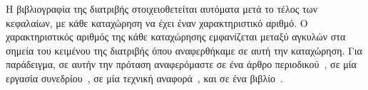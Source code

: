 Η βιβλιογραφία της διατριβής στοιχειοθετείται αυτόματα μετά το τέλος των κεφαλαίων, με κάθε καταχώρηση να έχει έναν χαρακτηριστικό αριθμό.
Ο χαρακτηριστικός αριθμός της κάθε καταχώρησης εμφανίζεται μεταξύ αγκυλών στα σημεία του κειμένου της διατριβής όπου αναφερθήκαμε σε αυτή την καταχώρηση.
Για παράδειγμα, σε αυτήν την πρόταση αναφερόμαστε σε ένα άρθρο περιοδικού~\cite{Newman2003a}, σε μία εργασία συνεδρίου~\cite{DeCandia2007a}, σε μία τεχνική αναφορά~\cite{Jain1984a}, και σε ένα βιβλίο~\cite{Golumbic2004a}.